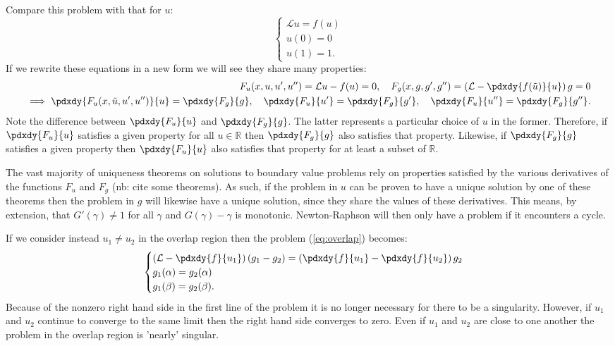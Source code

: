 \documentclass{book}
\begin{document}
Compare this problem with that for $u$:
\begin{equation*}
\begin{cases} \mathcal{L} u = f(u) \\ u(0) = 0 \\ u(1) = 1. \end{cases}
\end{equation*}
If we rewrite these equations in a new form we will see they share many properties:
\begin{align*}
F_u(x,u,u',u'') = \mathcal{L} u - f(u) = 0, \quad F_g(x,g,g',g'') = \left ( \mathcal{L} - \pdxdy{f(\tilde{u})}{u} \right ) g = 0 \\
\implies \pdxdy{F_u(x,\tilde{u},u',u'')}{u} = \pdxdy{F_g}{g}, \quad \pdxdy{F_u}{u'} = \pdxdy{F_g}{g'}, \quad \pdxdy{F_u}{u''} = \pdxdy{F_g}{g''} .
\end{align*}
Note the difference between $\pdxdy{F_u}{u}$ and $\pdxdy{F_g}{g}$.
The latter represents a particular choice of $u$ in the former.
Therefore, if $\pdxdy{F_u}{u}$ satisfies a given property for all $u \in \mathbb{R}$ then $\pdxdy{F_g}{g}$ also satisfies that property.
Likewise, if $\pdxdy{F_g}{g}$ satisfies a given property then $\pdxdy{F_u}{u}$ also satisfies that property for at least a subset of $\mathbb{R}$.

The vast majority of uniqueness theorems on solutions to boundary value problems rely on properties satisfied by the various derivatives of the functions $F_u$ and $F_g$ (nb: cite some theorems).
As such, if the problem in $u$ can be proven to have a unique solution by one of these theorems then the problem in $g$ will likewise have a unique solution, since they share the values of these derivatives.
This means, by extension, that $G'(\gamma) \neq 1$ for all $\gamma$ and $G(\gamma) - \gamma$ is monotonic.
Newton-Raphson will then only have a problem if it encounters a cycle.

If we consider instead $u_1 \neq u_2$ in the overlap region then the problem (\ref{eq:overlap}) becomes:
\begin{equation*}
\begin{cases} \left ( \mathcal{L} - \pdxdy{f}{u_1} \right ) (g_1 - g_2) = \left ( \pdxdy{f}{u_1} - \pdxdy{f}{u_2} \right ) g_2 \\
g_1(\alpha) = g_2(\alpha) \\ g_1(\beta) = g_2(\beta) . \end{cases}
\end{equation*}
Because of the nonzero right hand side in the first line of the problem it is no longer necessary for there to be a singularity.
However, if $u_1$ and $u_2$ continue to converge to the same limit then the right hand side converges to zero.
Even if $u_1$ and $u_2$ are close to one another the problem in the overlap region is 'nearly' singular.
\end{document}
